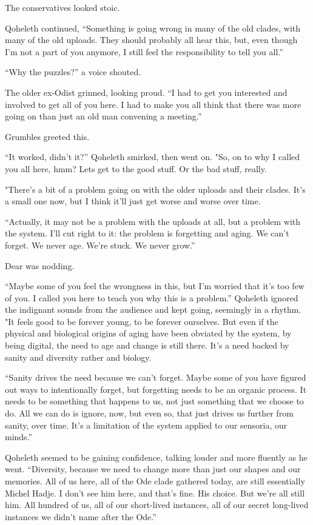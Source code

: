 The conservatives looked stoic.

Qoheleth continued, ``Something is going wrong in many of the old clades, with many of the old uploads. They should probably all hear this, but, even though I'm not a part of you anymore, I still feel the responsibility to tell you all.''

``Why the puzzles?'' a voice shouted.

The older ex-Odist grinned, looking proud. ``I had to get you interested and involved to get all of you here. I had to make you all think that there was more going on than just an old man convening a meeting.''

Grumbles greeted this.

``It worked, didn't it?'' Qoheleth smirked, then went on. "So, on to why I called you all here, hmm? Lets get to the good stuff. Or the bad stuff, really.

"There's a bit of a problem going on with the older uploads and their clades. It's a small one now, but I think it'll just get worse and worse over time.

``Actually, it may not be a problem with the uploads at all, but a problem with the system. I'll cut right to it: the problem is forgetting and aging. We can't forget. We never age. We're stuck. We never grow.''

Dear was nodding.

``Maybe some of you feel the wrongness in this, but I'm worried that it's too few of you. I called you here to teach you why this is a problem.'' Qoheleth ignored the indignant sounds from the audience and kept going, seemingly in a rhythm. "It feels good to be forever young, to be forever ourselves. But even if the physical and biological origins of aging have been obviated by the system, by being digital, the need to age and change is still there. It's a need backed by sanity and diversity rather and biology.

``Sanity drives the need because we can't forget. Maybe some of you have figured out ways to intentionally forget, but forgetting needs to be an organic process. It needs to be something that happens to us, not just something that we choose to do. All we can do is ignore, now, but even so, that just drives us further from sanity, over time. It's a limitation of the system applied to our sensoria, our minds.''

Qoheleth seemed to be gaining confidence, talking louder and more fluently as he went. ``Diversity, because we need to change more than just our shapes and our memories. All of us here, all of the Ode clade gathered today, are still essentially Michel Hadje. I don't see him here, and that's fine. His choice. But we're all still him. All hundred of us, all of our short-lived instances, all of our secret long-lived instances we didn't name after the Ode.''

